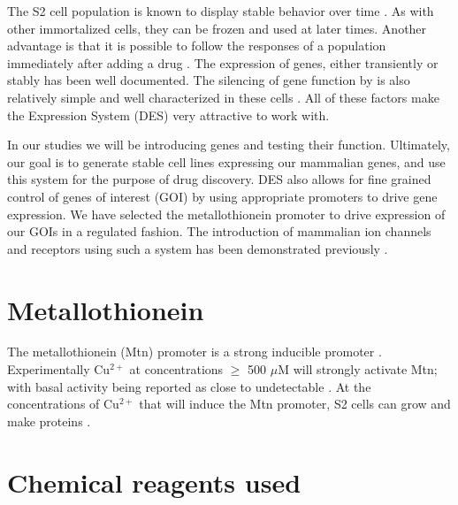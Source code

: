 The S2 cell population is known to display stable behavior over time \citep{Baum2008}. As with other immortalized cells, they can be frozen and used at later times. Another advantage is that it is possible to follow the responses of a population immediately after adding a drug \citep{Baum2008}. The expression of genes, either transiently or stably has been well documented. The silencing of gene function by \rnai{} is also relatively simple and well characterized in these cells \citep{Roos2005}. All of these factors make the \droso{} Expression System (DES) very attractive to work with.
 
In our studies we will be introducing genes and testing their function. Ultimately, our goal is to generate stable cell lines expressing our mammalian genes, and use this system for the purpose of drug discovery. DES also allows for fine grained control of genes of interest (GOI) by using appropriate promoters to drive gene expression. We have selected the metallothionein promoter to drive expression of our GOIs in a regulated fashion. The introduction of mammalian ion channels and receptors using such a system has been demonstrated previously \citep{Schetz2004, Johanson1995, Asmild2000, Lansdell2008, Pfeifer1998}.



\section{Metallothionein}

The \droso{} metallothionein (Mtn) promoter is a strong inducible promoter \citep{Schetz2004, Bunch1988,Millar1995,Yagodin1999}. Experimentally Cu$^{2+}$ at concentrations  $\ge$ 500 $\mu$M will strongly activate Mtn; with basal activity being reported as close to undetectable \citep{Schetz2004}. At the concentrations of Cu$^{2+}$ that will induce the Mtn promoter, S2 cells can grow and make proteins \citep{Schetz2004}.

\section{Chemical reagents used} 

